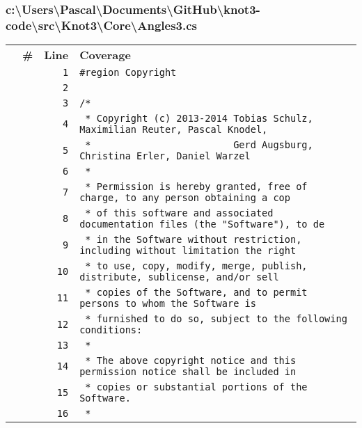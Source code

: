 \documentclass[a4paper,10pt]{article}
\begin{document}
\subsubsection{c:\textbackslash Users\textbackslash Pascal\textbackslash Documents\textbackslash GitHub\textbackslash knot3-code\textbackslash src\textbackslash Knot3\textbackslash Core\textbackslash Angles3.cs}
\begin{longtable}[l]{lrrl}
\textbf{} & \textbf{\#} & \textbf{Line} & \textbf{Coverage}\\
\cellcolor{gray} &  & \verb~1~ & \verb~#region Copyright~\\
\cellcolor{gray} &  & \verb~2~ & \verb~~\\
\cellcolor{gray} &  & \verb~3~ & \verb~/*~\\
\cellcolor{gray} &  & \verb~4~ & \verb~ * Copyright (c) 2013-2014 Tobias Schulz, Maximilian Reuter, Pascal Knodel,~\\
\cellcolor{gray} &  & \verb~5~ & \verb~ *                         Gerd Augsburg, Christina Erler, Daniel Warzel~\\
\cellcolor{gray} &  & \verb~6~ & \verb~ *~\\
\cellcolor{gray} &  & \verb~7~ & \verb~ * Permission is hereby granted, free of charge, to any person obtaining a cop~\\
\cellcolor{gray} &  & \verb~8~ & \verb~ * of this software and associated documentation files (the "Software"), to de~\\
\cellcolor{gray} &  & \verb~9~ & \verb~ * in the Software without restriction, including without limitation the right~\\
\cellcolor{gray} &  & \verb~10~ & \verb~ * to use, copy, modify, merge, publish, distribute, sublicense, and/or sell~\\
\cellcolor{gray} &  & \verb~11~ & \verb~ * copies of the Software, and to permit persons to whom the Software is~\\
\cellcolor{gray} &  & \verb~12~ & \verb~ * furnished to do so, subject to the following conditions:~\\
\cellcolor{gray} &  & \verb~13~ & \verb~ *~\\
\cellcolor{gray} &  & \verb~14~ & \verb~ * The above copyright notice and this permission notice shall be included in ~\\
\cellcolor{gray} &  & \verb~15~ & \verb~ * copies or substantial portions of the Software.~\\
\cellcolor{gray} &  & \verb~16~ & \verb~ *~\\

\end{longtable}
\end{document}
